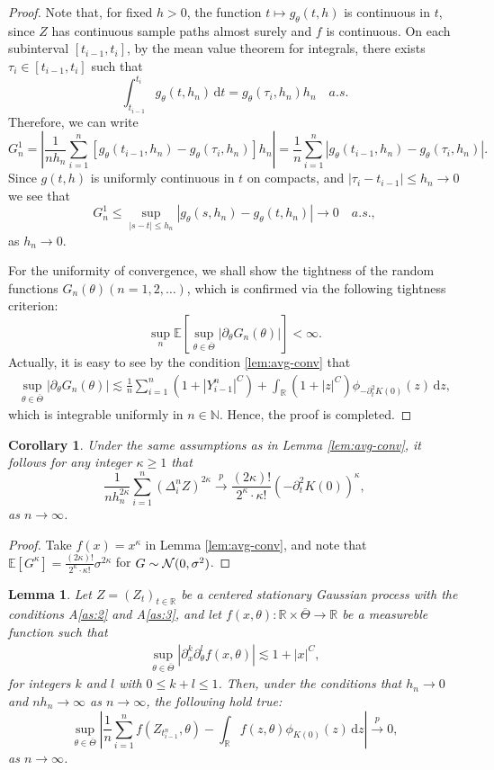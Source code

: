 \documentclass[a4paper,10pt,twoside]{article}
\newtheorem{lem}{Lemma}[section]
\newtheorem{cor}{Corollary}[section]
\numberwithin{equation}{section}
\def\R{\mathbb{R}}
\def\N{\mathbb{N}}
\def\D{\Delta}
\def\l{\left}
\def\r{\right}
\def\th{\theta}
\def\s{\sigma}
\def\k{\kappa}
\def\p{\partial}
\def\toP{\stackrel{p}{\longrightarrow}}
\def\E{\mathbb{E}}
\def\ol#1{\overline{#1}}
\def\df{\mathrm{d}}
\begin{document}
\begin{proof}
Note that, for fixed $h > 0$, the function $t \mapsto g_\th(t,h)$ is continuous in $t$, since $Z$ has continuous sample paths almost surely and $f$ is continuous.
On each subinterval $[t_{i-1}, t_i]$, by the mean value theorem for integrals, there exists $\tau_i \in [t_{i-1}, t_i]$ such that
\[
\int_{t_{i-1}}^{t_i} g_\th(t, h_n) \,\df t = g_\th(\tau_i, h_n) h_n\quad a.s.
\]
Therefore, we can write
\[
G_n^1 = \l| \frac{1}{nh_n} \sum_{i=1}^n \l[ g_\th(t_{i-1}, h_n) - g_\th(\tau_i, h_n) \r] h_n \r| 
= \frac{1}{n} \sum_{i=1}^n \l| g_\th(t_{i-1}, h_n) - g_\th(\tau_i, h_n) \r|.
\]
Since $g(t,h)$ is uniformly continuous in $t$ on compacts, and $|\tau_i - t_{i-1}| \le h_n \to 0$ we see that 
\[
G_n^1 \le \sup_{|s - t| \le h_n} |g_\th(s, h_n) - g_\th(t, h_n)| \to 0\quad a.s., 
\]
as $h_n\to 0$. 

For the uniformity of convergence, we shall show the tightness of the random functions $G_n(\th) (n=1,2,\dots)$, which is confirmed via the following tightness criterion: 
\[
\sup_n\E\l[ \sup_{\th\in \ol{\Theta}} \l|\p_\th G_n(\th)\r|\r] < \infty. 
\]
Actually, it is easy to see by the condition \eqref{lem:avg-conv} that 
\begin{align*}
\sup_{\th\in \ol{\Theta}} \l|\p_\th G_n(\th)\r| \lesssim \frac{1}{n}\sum_{i=1}^n (1 + |Y_{i-1}^n|^C) + \int_\R (1 + |z|^C)\phi_{-\p^2_t K(0)}(z)\,\df z, 
\end{align*}
which is integrable uniformly in $n\in \N$. Hence, the proof is completed. 
\end{proof}


\begin{cor}\label{cor:moment}
Under the same assumptions as in Lemma \ref{lem:avg-conv}, it follows for any integer $\k\ge 1$ that
\[
\frac{1}{nh_n^ {2\k}} \sum_{i=1}^n (\D_i^n Z)^{2\k} \toP \frac{(2\k)!}{2^\k\cdot \k!} \l(-\p^2_t K(0)\r)^\k, 
\]
as $n\to \infty$. 
\end{cor}

\begin{proof}
Take $f(x) = x^\k$ in Lemma \ref{lem:avg-conv}, and note that $\E[G^\k] = \frac{(2\k)!}{2^\k\cdot \k!} \s^{2\k}$ for $G\sim {\cal N}(0,\s^2)$. 

\end{proof}


\begin{lem}\label{lem:ergod}
Let $Z = (Z_t)_{t \in \mathbb{R}}$ be a centered stationary Gaussian process with the conditions A\ref{as:2} and  A\ref{as:3}, and 
let $f(x,\th): \R\times \ol{\Theta} \to \R$ be a measureble function such that 
\begin{align}
\sup_{\th \in \ol{\Theta}}|\p_x^k \p_\th^l f(x,\th)| \lesssim 1 + |x|^C, \label{cond:ergod}
\end{align}
for integers $k$ and $l$ with $0\le k+l\le 1$. 
Then, under the conditions that $h_n \to 0$ and $nh_n\to \infty$ as $n\to \infty$, the following hold true:
\[
\sup_{\th \in \ol{\Theta}}\l|\frac{1}{n} \sum_{i=1}^n f(Z_{t_{i-1}^n},\th) - \int_\R f(z,\th)\phi_{K(0)}(z)\,\df z\r|\toP 0,
\]
as $n\to \infty$. 
\end{lem}
\end{document}
